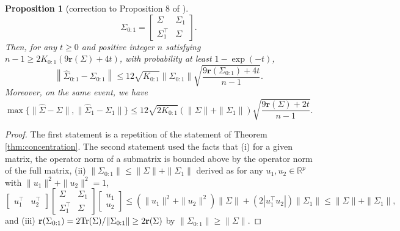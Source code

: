 \documentclass[11pt,a4paper]{article}
\newtheorem{proposition}[theorem]{Proposition}
\theoremstyle{remark}
\theoremstyle{definition}
\newcommand{\bu}{u}
\newcommand{\bSigma}{\Sigma}
\newcommand{\R}{\mathbb{R}}
\newcommand{\tr}{\textnormal{Tr}}
\newcommand{\er}{\mathbf{r}}
\theoremstyle{definition}
\renewcommand{\hat}{\widehat}
\begin{document}
\begin{bibunit}[apalike]
\begin{proposition}[correction to Proposition 8 of \citealp{nakakita2024dimension}]
\begin{equation*}
    \bSigma_{0:1}=\left[\begin{matrix}
        \bSigma & \bSigma_{1}\\
        \bSigma_{1}^{\top} & \bSigma
    \end{matrix}\right].
\end{equation*}
Then, for any $t\ge0$ and positive integer $n$ satisfying $n-1\ge 2K_{0:1}(9\er(\bSigma)+4t)$, with probability at least $1-\exp(-t)$,
    \begin{equation*}
        \left\|\hat{\bSigma}_{0:1}-\bSigma_{0:1}\right\|\le  12\sqrt{K_{0:1}}\|\bSigma_{0:1}\|\sqrt{\frac{9\er(\bSigma_{0:1})+4t}{n-1}}.
    \end{equation*}
    Moreover, on the same event, we have
    \begin{equation*}
        \max\{\|\hat{\bSigma}-\bSigma\|,\|\hat{\bSigma}_{1}-\bSigma_{1}\|\}\le 12\sqrt{2K_{0:1}}(\|\bSigma\|+\|\bSigma_{1}\|)\sqrt{\frac{9\er(\bSigma)+2t}{n-1}}.
    \end{equation*}
\end{proposition}

\begin{proof}
The first statement is a repetition of the statement of Theorem \ref{thm:concentration}.
The second statement used the facts that (i) for a given matrix, the operator norm of a submatrix is bounded above by the operator norm of the full matrix,
(ii) $\|\bSigma_{0:1}\|\le \|\bSigma\|+\|\bSigma_{1}\|$ derived as for any $\bu_{1},\bu_{2}\in\R^{p}$ with $\|\bu_{1}\|^{2}+\|\bu_{2}\|^{2}=1$,
\begin{equation*}
    \left[\begin{matrix}
        \bu_{1}^{\top} & \bu_{2}^{\top}
    \end{matrix}\right]\left[\begin{matrix}
        \bSigma & \bSigma_{1}\\
        \bSigma_{1}^{\top} & \bSigma
    \end{matrix}\right]
    \left[\begin{matrix}
        \bu_{1}\\
        \bu_{2}
    \end{matrix}\right]\le (\|\bu_{1}\|^{2}+\|\bu_{2}\|^{2})\|\bSigma\|+(2|\bu_{1}^{\top}\bu_{2}|)\|\bSigma_{1}\|\le \|\bSigma\|+\|\bSigma_{1}\|,
\end{equation*}
and (iii) $\er(\bSigma_{0:1})=2\tr(\bSigma)/\|\bSigma_{0:1}\|\ge 2\er(\bSigma)$ by $\|\bSigma_{0:1}\|\ge \|\bSigma\|$.
\end{proof}


\end{bibunit}
\end{document}
